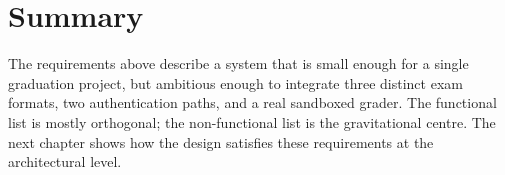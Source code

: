 \section{Summary}

The requirements above describe a system that is small enough for a single graduation project, but ambitious enough to integrate three distinct exam formats, two authentication paths, and a real sandboxed grader. The functional list is mostly orthogonal; the non-functional list is the gravitational centre. The next chapter shows how the design satisfies these requirements at the architectural level.
